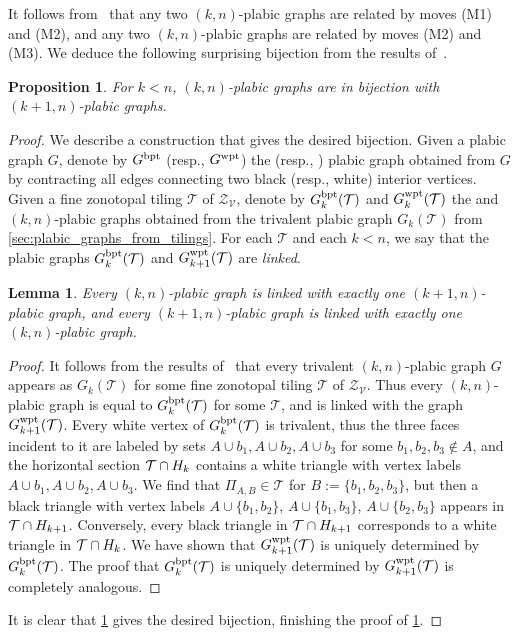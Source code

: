 \documentclass[11pt]{amsart}
\theoremstyle{plain}
\newtheorem{proposition}[theorem]{Proposition}
\newtheorem{lemma}[theorem]{Lemma}
\theoremstyle{definition}
\def\V{\mathcal{V}}
\def\Zon{\mathcal{Z}}
\def\ZV{\Zon_\V}
\def\Tcal{\mathcal{T}}
\def\Tiling{\Tcal}
\begin{document}
It follows from~\cite[Theorem~13.4]{Pos06} that any two \bpt $(k,n)$-plabic graphs are related by moves (M1) and (M2), and any two \wpt $(k,n)$-plabic graphs are related by moves (M2) and (M3). We deduce the following surprising bijection from the results of~\cite{Gal}.

\begin{proposition}\label{prop:bpt_wpt}
For $k<n$, \bpt $(k,n)$-plabic graphs are in bijection with \wpt $(k+1,n)$-plabic graphs.
\end{proposition}
\begin{proof}
We describe a construction that gives the desired bijection. Given a plabic graph $G$, denote by $G^{\operatorname{bpt}}$ (resp., $G^{\operatorname{wpt}}$) the \bpt (resp., \wpt) plabic graph obtained from $G$ by contracting all edges connecting two black (resp., white) interior vertices. Given a fine zonotopal tiling $\Tiling$ of $\ZV$,  denote by $\Gbpt_k(\Tiling)$ and $\Gwpt_k(\Tiling)$ the \bpt and \wpt $(k,n)$-plabic graphs obtained from the trivalent plabic graph $G_k(\Tiling)$ from \cref{sec:plabic_graphs_from_tilings}. For each $\Tiling$ and each $k<n$, we say that the plabic graphs $\Gbpt_k(\Tiling)$ and $\Gwpt_{k+1}(\Tiling)$ are \emph{linked}.
\begin{lemma}\label{lemma:bpt_wpt_bij}
Every \bpt $(k,n)$-plabic graph is linked with exactly one \wpt $(k+1,n)$-plabic graph, and every \wpt $(k+1,n)$-plabic graph is linked with exactly one \bpt $(k,n)$-plabic graph.
\end{lemma}
\begin{proof}
It follows from the results of~\cite{Gal} that every trivalent $(k,n)$-plabic graph $G$ appears as $G_k(\Tiling)$ for some fine zonotopal tiling $\Tiling$ of $\ZV$. Thus every \bpt $(k,n)$-plabic graph is equal to $\Gbpt_k(\Tiling)$ for some $\Tiling$, and is linked with the graph $\Gwpt_{k+1}(\Tiling)$. Every white vertex of $\Gbpt_k(\Tiling)$ is trivalent, thus the three faces incident to it are labeled by sets $A\cup b_1,A\cup b_2,A\cup b_3$ for some $b_1,b_2,b_3\notin A$, and the horizontal section $\Tiling\cap \Hyp_k$ contains a white triangle with vertex labels $A\cup b_1,A\cup b_2,A\cup b_3$. We find that $\Pi_{A,B}\in\Tiling$ for $B:=\{b_1,b_2,b_3\}$, but then a black triangle with vertex labels $A\cup \{b_1,b_2\}$, $A\cup \{b_1,b_3\}$, $A\cup \{b_2,b_3\}$ appears in $\Tiling\cap \Hyp_{k+1}$. Conversely, every black triangle in $\Tiling\cap \Hyp_{k+1}$ corresponds to a white triangle in $\Tiling\cap \Hyp_k$. We have shown that $\Gwpt_{k+1}(\Tiling)$ is uniquely determined by $\Gbpt_k(\Tiling)$. The proof that  $\Gbpt_{k}(\Tiling)$ is uniquely determined by $\Gwpt_{k+1}(\Tiling)$ is completely analogous.
\end{proof}
It is clear that \cref{lemma:bpt_wpt_bij} gives the desired bijection, finishing the proof of \cref{prop:bpt_wpt}.
\end{proof}
\end{document}

